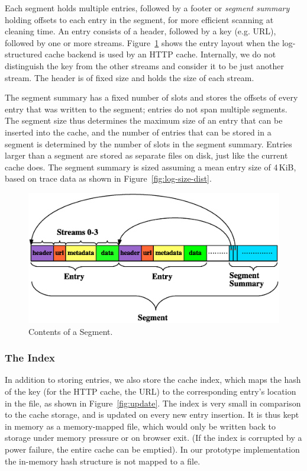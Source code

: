\documentclass[letterpaper,twocolumn,10pt]{article}
\begin{document}
Each segment holds multiple entries, followed by a footer or \emph{segment
  summary} holding offsets to each entry in the segment, for more efficient
scanning at cleaning time.  An entry consists of a header, followed by a key
(e.g. URL), followed by one or more streams. Figure~\ref{fig:segment} shows the
entry layout when the log-structured cache backend is used by an HTTP cache.
Internally, we do not distinguish the key from the other streams and consider it
to be just another stream.  The header is of fixed size and holds the size of
each stream.

The segment summary has a fixed number of slots and stores the offsets of every
entry that was written to the segment; entries do not span multiple segments.
The segment size thus determines the maximum size of an entry that can be
inserted into the cache, and the number of entries that can be stored in a
segment is determined by the number of slots in the segment summary.  Entries
larger than a segment are stored as separate files on disk, just like the
current cache does.  The segment summary is sized assuming a mean entry size of
4\,KiB, based on trace data as shown in Figure~\ref{fig:log-size-dist}.

\begin{figure}[t]
  \begin{center}
    \includegraphics[width=\columnwidth]{graphs/segment}
  \end{center}
  \caption{Contents of a Segment.}
  \label{fig:segment} 
\end{figure}

\subsubsection{The Index}
In addition to storing entries, we also store the cache index, which maps the
hash of the key (for the HTTP cache, the URL) to the corresponding entry's
location in the file, as shown in Figure~\ref{fig:update}.  The index is very
small in comparison to the cache storage, and is updated on every new entry
insertion.  It is thus kept in memory as a memory-mapped file, which would only
be written back to storage under memory pressure or on browser exit. (If the
index is corrupted by a power failure, the entire cache can be emptied).  In our
prototype implementation the in-memory hash structure is not mapped to a file.
\end{document}
